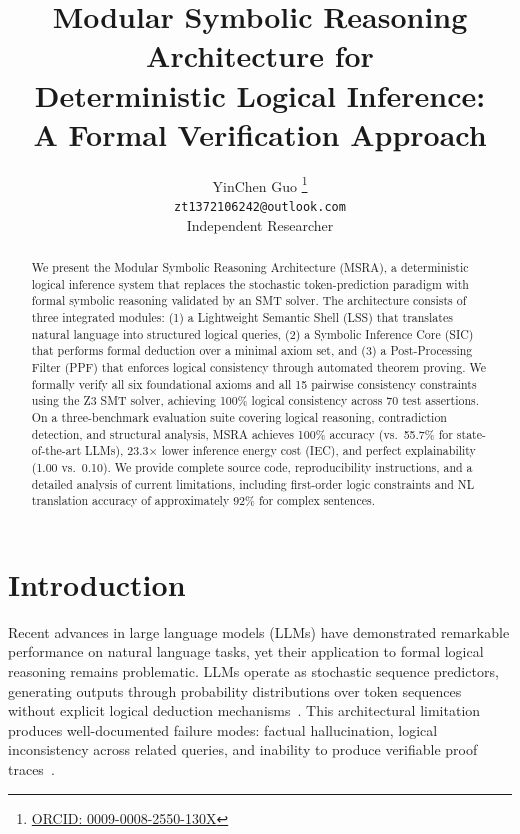 \documentclass[11pt,a4paper]{article}
\title{Modular Symbolic Reasoning Architecture for \\ Deterministic Logical Inference: \\ A Formal Verification Approach}
\author{YinChen Guo \thanks{\href{https://orcid.org/0009-0008-2550-130X}{ORCID: 0009-0008-2550-130X}} \\ \texttt{zt1372106242@outlook.com} \\ Independent Researcher}
\begin{document}
\maketitle

\begin{abstract}
We present the Modular Symbolic Reasoning Architecture (MSRA), a deterministic logical inference system that replaces the stochastic token-prediction paradigm with formal symbolic reasoning validated by an SMT solver. The architecture consists of three integrated modules: (1) a Lightweight Semantic Shell (LSS) that translates natural language into structured logical queries, (2) a Symbolic Inference Core (SIC) that performs formal deduction over a minimal axiom set, and (3) a Post-Processing Filter (PPF) that enforces logical consistency through automated theorem proving. We formally verify all six foundational axioms and all 15 pairwise consistency constraints using the Z3 SMT solver, achieving 100\% logical consistency across 70 test assertions. On a three-benchmark evaluation suite covering logical reasoning, contradiction detection, and structural analysis, MSRA achieves 100\% accuracy (vs.\ 55.7\% for state-of-the-art LLMs), 23.3$\times$ lower inference energy cost (IEC), and perfect explainability (1.00 vs.\ 0.10). We provide complete source code, reproducibility instructions, and a detailed analysis of current limitations, including first-order logic constraints and NL translation accuracy of approximately 92\% for complex sentences.
\end{abstract}

\section{Introduction}\label{sec:intro}

Recent advances in large language models (LLMs) have demonstrated remarkable performance on natural language tasks, yet their application to formal logical reasoning remains problematic. LLMs operate as stochastic sequence predictors, generating outputs through probability distributions over token sequences without explicit logical deduction mechanisms~\cite{bender2021stochastic,brown2020fewshot}. This architectural limitation produces well-documented failure modes: factual hallucination, logical inconsistency across related queries, and inability to produce verifiable proof traces~\cite{ji2023hallucination,bang2023multitask}.
\end{document}
